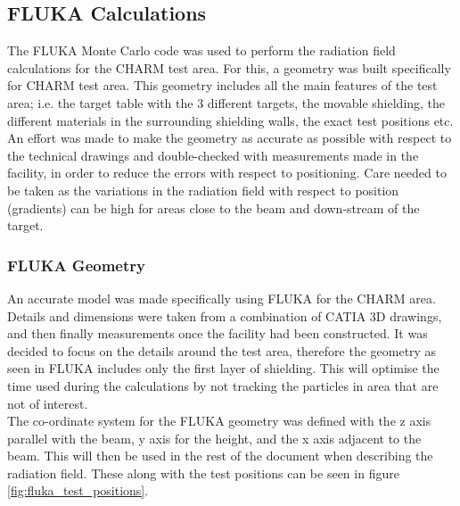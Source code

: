 






\newpage
\subsection{FLUKA Calculations}

The FLUKA Monte Carlo code \cite{FLUKA1} \cite{FLUKA2} was used to perform the radiation field calculations for the CHARM test area. For this, a geometry was built specifically for CHARM test area. This geometry includes all the main features of the test area; i.e. the target table with the 3 different targets, the movable shielding, the different materials in the surrounding shielding walls, the exact test positions etc. An effort was made to make the geometry as accurate as possible with respect to the technical drawings and double-checked with measurements made in the facility, in order to reduce the errors with respect to positioning. Care needed to be taken as the variations in the radiation field with respect to position (gradients) can be high for areas close to the beam and down-stream of the target. \\

\subsubsection{FLUKA Geometry}

An accurate model was made specifically using FLUKA for the CHARM area. Details and dimensions were taken from a combination of CATIA 3D drawings, and then finally measurements once the facility had been constructed. It was decided to focus on the details around the test area, therefore the geometry as seen in FLUKA includes only the first layer of shielding. This will optimise the time used during the calculations by not tracking the particles in area that are not of interest. \\

The co-ordinate system for the FLUKA geometry was defined with the z axis parallel with the beam, y axis for the height, and the x axis adjacent to the beam. This will then be used in the rest of the document when describing the radiation field. These along with the test positions can be seen in figure \ref{fig:fluka_test_positions}.\\


